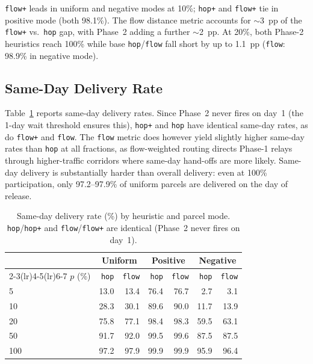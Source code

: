 \documentclass[11pt,a4paper]{article}
\begin{document}
\texttt{flow+} leads in uniform and negative modes at 10\%; \texttt{hop+}
and \texttt{flow+} tie in positive mode (both 98.1\%). The flow distance
metric accounts for $\sim$3~pp of the \texttt{flow+} vs.\ \texttt{hop}
gap, with Phase~2 adding a further $\sim$2~pp. At 20\%, both Phase-2
heuristics reach 100\% while base \texttt{hop}/\texttt{flow} fall short by
up to 1.1~pp (\texttt{flow}: 98.9\% in negative mode).

\subsection{Same-Day Delivery Rate}

Table~\ref{tab:sameday} reports same-day delivery rates. Since Phase~2 never
fires on day~1 (the 1-day wait threshold ensures this), \texttt{hop+} and
\texttt{hop} have identical same-day rates, as do \texttt{flow+} and
\texttt{flow}. The \texttt{flow} metric does however yield slightly higher
same-day rates than \texttt{hop} at all fractions, as flow-weighted routing
directs Phase-1 relays through higher-traffic corridors where same-day
hand-offs are more likely. Same-day delivery is substantially harder than
overall delivery: even at 100\% participation, only 97.2--97.9\% of uniform
parcels are delivered on the day of release.

\begin{table}[ht]
\centering
\caption{Same-day delivery rate (\%) by heuristic and parcel mode.
         \texttt{hop}/\texttt{hop+} and \texttt{flow}/\texttt{flow+} are
         identical (Phase~2 never fires on day~1).}
\label{tab:sameday}
\small
\begin{tabular}{lrrrrrr}
\toprule
 & \multicolumn{2}{c}{Uniform} & \multicolumn{2}{c}{Positive} & \multicolumn{2}{c}{Negative} \\
\cmidrule(lr){2-3}\cmidrule(lr){4-5}\cmidrule(lr){6-7}
$p$ (\%) & \texttt{hop} & \texttt{flow} & \texttt{hop} & \texttt{flow} & \texttt{hop} & \texttt{flow} \\
\midrule
  5    & 13.0 & 13.4 & 76.4 & 76.7 &  2.7 &  3.1 \\
 10    & 28.3 & 30.1 & 89.6 & 90.0 & 11.7 & 13.9 \\
 20    & 75.8 & 77.1 & 98.4 & 98.3 & 59.5 & 63.1 \\
 50    & 91.7 & 92.0 & 99.5 & 99.6 & 87.5 & 87.5 \\
100    & 97.2 & 97.9 & 99.9 & 99.9 & 95.9 & 96.4 \\
\bottomrule
\end{tabular}
\end{table}
\end{document}
